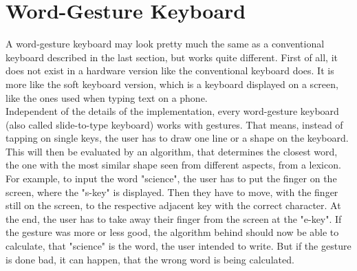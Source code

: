 \section{Word-Gesture Keyboard}
A word-gesture keyboard may look pretty much the same as a conventional keyboard described in the last section, but works quite different. First of all, it does not exist in a hardware version like the conventional keyboard does. It is more like the soft keyboard version, which is a keyboard displayed on a screen, like the ones used when typing text on a phone.\\
Independent of the details of the implementation, every word-gesture keyboard (also called slide-to-type keyboard) works with gestures. That means, instead of tapping on single keys, the user has to draw one line or a shape on the keyboard. This will then be evaluated by an algorithm, that determines the closest word, the one with the most similar shape seen from different aspects, from a lexicon. For example, to input the word "science", the user has to put the finger on the screen, where the "s-key" is displayed. Then they have to move, with the finger still on the screen, to the respective adjacent key with the correct character. At the end, the user has to take away their finger from the screen at the "e-key". If the gesture was more or less good, the algorithm behind should now be able to calculate, that "science" is the word, the user intended to write. But if the gesture is done bad, it can happen, that the wrong word is being calculated. 

